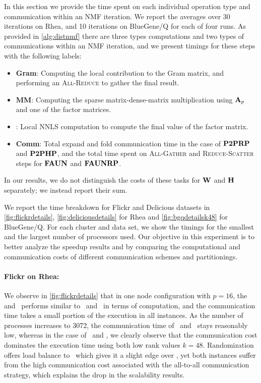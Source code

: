 In this section we provide the time spent on each individual operation type and communication within an NMF iteration.
We report the averages over 30 iterations on Rhea, and 10 iterations on BlueGene/Q for each of four runs.
As provided in \cref{alg:distnmf} there are three types computations and two types of communications within an NMF iteration, and we present timings for these steps with the following labels:
\begin{itemize}
	\item \textbf{Gram}: Computing the local contribution to the Gram matrix, and performing an \textsc{All-Reduce} to gather the final result.
	\item \textbf{MM}: Computing the sparse matrix-dense-matrix multiplication using $\mathbf{A}_p$ and one of the factor matrices.
	\item \textbf{\NLS}: Local NNLS computation to compute the final value of the factor matrix.
	\item \textbf{Comm}: Total expand and fold communication time in the case of $\textbf{P2PRP}$ and $\textbf{P2PHP}$,  and the total time spent on \textsc{All-Gather} and \textsc{Reduce-Scatter} steps for $\textbf{FAUN}$ and $\textbf{FAUNRP}$.
\end{itemize}
In our results, we do not distinguish the costs of these tasks for $\mathbf{W}$ and $\mathbf{H}$ separately; we instead report their sum.

We report the time breakdown for Flickr and Delicious datasets in \cref{fig:flickrdetails}, \cref{fig:deliciousdetails} for Rhea and \cref{fig:bgqdetailsk48} for BlueGene/Q.
For each cluster and data set, we show the timings for the smallest and the largest number of processors used.
Our objective in this experiment is to better analyze the speedup results and by comparing the computational and communication costs of different communication schemes and partitionings.


\paragraph{Flickr on Rhea:} We observe in \cref{fig:flickrdetails} that in one node configuration with $p=16$, the \unp and \urp\  performs similar to \crp\ and \cpp\ in terms of computation, and the communication time takes a small portion of the execution in all instances.
As the number of processes increases to 3072, the communication time of \crp\ and \cpp\ stays reasonably low, whereas in the case of \unp\  and \urp, we clearly observe that the communication cost dominates the execution time using both low rank values  $k=48$.
Randomization offers load balance to \urp\ which gives it a slight edge over \unp, yet both instances suffer from the high communication cost associated with the all-to-all communication strategy, which explains the drop in the scalability results.

